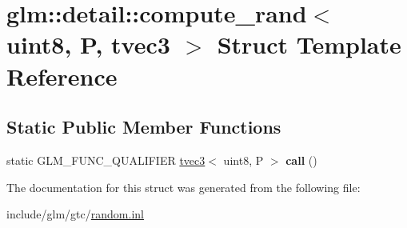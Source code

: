 \hypertarget{structglm_1_1detail_1_1compute__rand_3_01uint8_00_01P_00_01tvec3_01_4}{}\section{glm\+:\+:detail\+:\+:compute\+\_\+rand$<$ uint8, P, tvec3 $>$ Struct Template Reference}
\label{structglm_1_1detail_1_1compute__rand_3_01uint8_00_01P_00_01tvec3_01_4}
\subsection*{Static Public Member Functions}
\begin{DoxyCompactItemize}
\item 
\mbox{\label{structglm_1_1detail_1_1compute__rand_3_01uint8_00_01P_00_01tvec3_01_4_a6c86825a493fcef72cb61f2ed94a2b52}} 
static G\+L\+M\+\_\+\+F\+U\+N\+C\+\_\+\+Q\+U\+A\+L\+I\+F\+I\+ER \hyperlink{structglm_1_1tvec3}{tvec3}$<$ uint8, P $>$ {\bfseries call} ()
\end{DoxyCompactItemize}


The documentation for this struct was generated from the following file\+:\begin{DoxyCompactItemize}
\item 
include/glm/gtc/\hyperlink{random_8inl}{random.\+inl}\end{DoxyCompactItemize}

